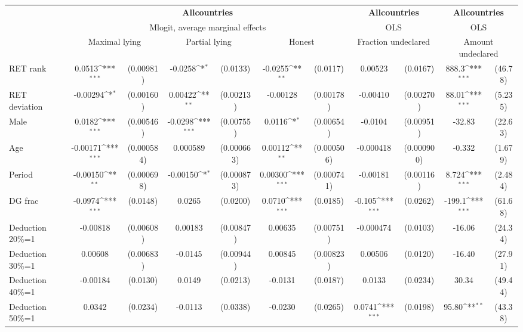 \def\sym#1{\ifmmode^{#1}\else\(^{#1}\)\fi}
\begin{tabular}{l|cccccc|cc|cc}
\hline\hline
&\multicolumn{6}{c|}{\bf All\space{}countries}&\multicolumn{2}{c|}{\bf All\space{}countries}&\multicolumn{2}{c}{\bf All\space{}countries}\\ &\multicolumn{6}{c|}{Mlogit, average marginal effects }&\multicolumn{2}{c|}{OLS}&\multicolumn{2}{c}{OLS}\\
                &\multicolumn{2}{c}{Maximal lying}&\multicolumn{2}{c}{Partial lying}&\multicolumn{2}{c}{Honest}  &\multicolumn{2}{c}{Fraction undeclared}&\multicolumn{2}{c}{Amount undeclared}\\
\hline
RET rank        &   0.0513\sym{***}&(0.00981)&  -0.0258\sym{*}  & (0.0133)&  -0.0255\sym{**} & (0.0117)&  0.00523         & (0.0167)&    888.3\sym{***}&  (46.78)\\
RET deviation   & -0.00294\sym{*}  &(0.00160)&  0.00422\sym{**} &(0.00213)& -0.00128         &(0.00178)& -0.00410         &(0.00270)&    88.01\sym{***}&  (5.235)\\
Male            &   0.0182\sym{***}&(0.00546)&  -0.0298\sym{***}&(0.00755)&   0.0116\sym{*}  &(0.00654)&  -0.0104         &(0.00951)&   -32.83         &  (22.63)\\
Age             & -0.00171\sym{***}&(0.000584)& 0.000589         &(0.000663)&  0.00112\sym{**} &(0.000506)&-0.000418         &(0.000900)&   -0.332         &  (1.679)\\
Period          & -0.00150\sym{**} &(0.000698)& -0.00150\sym{*}  &(0.000873)&  0.00300\sym{***}&(0.000741)& -0.00181         &(0.00116)&    8.724\sym{***}&  (2.484)\\
DG frac         &  -0.0974\sym{***}& (0.0148)&   0.0265         & (0.0200)&   0.0710\sym{***}& (0.0185)&   -0.105\sym{***}& (0.0262)&   -199.1\sym{***}&  (61.68)\\
Deduction 20\%=1& -0.00818         &(0.00608)&  0.00183         &(0.00847)&  0.00635         &(0.00751)&-0.000474         & (0.0103)&   -16.06         &  (24.34)\\
Deduction 30\%=1&  0.00608         &(0.00683)&  -0.0145         &(0.00944)&  0.00845         &(0.00823)&  0.00506         & (0.0120)&   -16.40         &  (27.91)\\
Deduction 40\%=1& -0.00184         & (0.0130)&   0.0149         & (0.0213)&  -0.0131         & (0.0187)&   0.0133         & (0.0234)&    30.34         &  (49.44)\\
Deduction 50\%=1&   0.0342         & (0.0234)&  -0.0113         & (0.0338)&  -0.0230         & (0.0265)&   0.0741\sym{***}& (0.0198)&    95.80\sym{**} &  (43.38)\\

\end{tabular}

